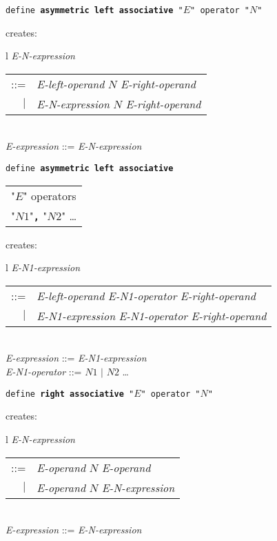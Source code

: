 \documentclass[12pt]{article}
\newcommand{\TT}[1]{{\tt \bfseries #1}}
\newenvironment{indpar}[1][0.3in]%
	{\begin{list}{}%
		     {\setlength{\itemsep}{0in}%
		      \setlength{\topsep}{0in}%
		      \setlength{\parsep}{1ex}%
		      \setlength{\labelwidth}{#1}%
		      \setlength{\leftmargin}{#1}%
		      \addtolength{\leftmargin}{\labelsep}}%
	 \item}%
	{\end{list}}
\begin{document}
\begin{indpar}
{\tt define \TT{asymmetric left associative} "$E$" operator "$N$"}
\begin{indpar}
creates: \begin{tabular}[t]{l}
         {\em E-N-expression} \begin{tabular}[t]{rl}
                            ::= & {\em E-left-operand} $N$
			          {\em E-right-operand} \\
                            $|$ & {\em E-N-expression} $N$
			          {\em E-right-operand} \\
                            \end{tabular} \\
         {\em E-expression} ::= {\em E-N-expression} \\
	 \end{tabular}
\end{indpar}

{\tt define \TT{asymmetric left associative} \begin{tabular}[t]{l}
                                             "$E$" operators \\
					     "$N1$"\TT{,} "$N2$" \ldots \\
					     \end{tabular}}
\begin{indpar}
creates: \begin{tabular}[t]{l}
         {\em E-N1-expression} \begin{tabular}[t]{rl}
                            ::= & {\em E-left-operand} {\em E-N1-operator}
			          {\em E-right-operand} \\
                            $|$ & {\em E-N1-expression} {\em E-N1-operator}
			          {\em E-right-operand} \\
                            \end{tabular} \\
         {\em E-expression} ::= {\em E-N1-expression} \\
         {\em E-N1-operator} ::= $N1$ $|$ $N2$ \ldots \\
	 \end{tabular}
\end{indpar}

{\tt define \TT{right associative} "$E$" operator "$N$"}
\begin{indpar}
creates: \begin{tabular}[t]{l}
         {\em E-N-expression} \begin{tabular}[t]{rl}
                            ::= & {\em E-operand} $N$ {\em E-operand} \\
                            $|$ & {\em E-operand} $N$ {\em E-N-expression} \\
                            \end{tabular} \\
         {\em E-expression} ::= {\em E-N-expression} \\
	 \end{tabular}
\end{indpar}


\end{indpar}
\end{document}
